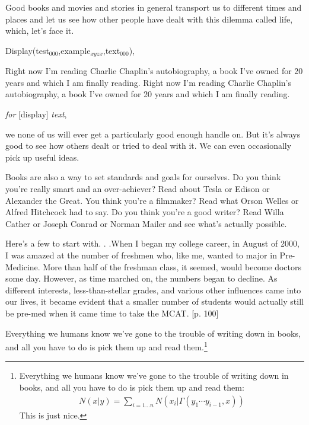 \documentclass[manuscript]{clv2025}
\begin{document}
Good books and movies and stories in general transport us to different times and places and let us see how other people have dealt with this dilemma called life, which, let's face it.
\begin{displaytext}
Display(test$_{000}$,example$_{xyzx}$,text$_{000}$),
\end{displaytext}
Right now I'm reading Charlie Chaplin's autobiography, a book I've owned for 20 years and which I am finally reading. Right now I'm reading Charlie Chaplin's autobiography, a book I've owned for 20 years and which I am finally reading.
\begin{displaytext}
[test] {\em for} [display] {\em text},
\end{displaytext}
we none of us will ever get a particularly good enough handle on. But it's always good to see how others dealt or tried to deal with it. We can even occasionally pick up useful ideas.

Books are also a way to set standards and goals for ourselves. Do you think you're really smart and an over-achiever? Read about Tesla or Edison or Alexander the Great. You think you're a filmmaker? Read what Orson Welles or Alfred Hitchcock had to say. Do you think you're a good writer? Read Willa Cather or Joseph Conrad or Norman Mailer and see what's actually possible.
\begin{extract}
Here's a few to start with. . .When I began my college career, in August of 2000, I was amazed at the number of freshmen who, like me, wanted to major in Pre-Medicine. More than half of the freshman class, it seemed, would become doctors some day. However, as time marched on, the numbers began to decline. As different interests, less-than-stellar grades, and various other influences came into our lives, it became evident that a smaller number of students would actually still be pre-med when it came time to take the MCAT. [p. 100]
\end{extract}
Everything we humans know we've gone to the trouble of writing down in books, and all you have to do is pick them up and read them.\footnote{Everything we humans know we've gone to the trouble of writing down in books, and all you have to do is pick them up and read them:
\begin{align}
N(x|y)=\sum_{i=1\dots n}N(x_i|\Gamma(y_1\cdots y_{i-1},x)) \nonumber
\end{align}
This is just nice.
}
\end{document}
